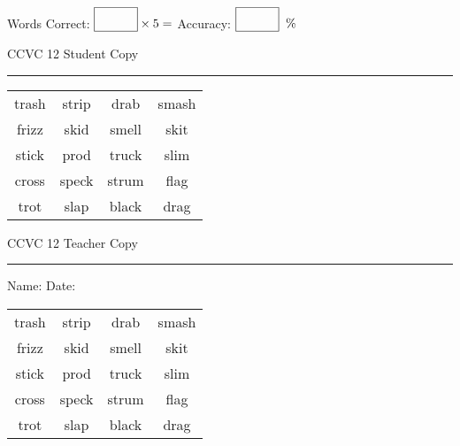 \documentclass{memoir}
\begin{document}
\small

Words Correct: $\fbox{\phantom{\huge 100}} \times 5 = $ Accuracy: $\fbox{\phantom{\huge 100}}\;\; \%$ 

\vfill

\newpage


\footnotesize \noindent
CCVC 12 \hfill Student Copy
\smallskip
\hrule

\Large

\setlength{\tabcolsep}{14pt}
\def\arraystretch{3}

{\selectfont


\begin{vplace}[0.5]
\begin{center}
\begin{tabular}{cccc}
trash & strip & drab             & smash \\
frizz & skid & smell & skit \\
stick & prod & truck & slim \\
cross & speck & strum & flag             \\
trot & slap            & black            & drag        \\
\end{tabular}
\end{center}
\end{vplace}

}

\newpage

\footnotesize \noindent
CCVC 12 \hfill Teacher Copy
\smallskip
\hrule

\small

\vfill

\noindent
Name: \underline{\hspace{1.75in}} \hfill Date: \underline{\hspace{1in}}

\Large

{\selectfont


\begin{vplace}[0.5]
\begin{center}
\begin{tabular}{cccc}
trash & strip & drab             & smash \\
frizz & skid & smell & skit \\
stick & prod & truck & slim \\
cross & speck & strum & flag             \\
trot & slap            & black            & drag        \\
\end{tabular}
\end{center}
\end{vplace}



}
\end{document}
